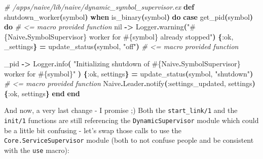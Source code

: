 \documentclass[
  oneside]{book}
\newenvironment{Shaded}{\begin{snugshade}}{\end{snugshade}}
\newcommand{\CommentTok}[1]{\textcolor[rgb]{0.56,0.35,0.01}{\textit{#1}}}
\newcommand{\ConstantTok}[1]{\textcolor[rgb]{0.56,0.35,0.01}{#1}}
\newcommand{\FunctionTok}[1]{\textcolor[rgb]{0.13,0.29,0.53}{\textbf{#1}}}
\newcommand{\KeywordTok}[1]{\textcolor[rgb]{0.13,0.29,0.53}{\textbf{#1}}}
\newcommand{\NormalTok}[1]{#1}
\newcommand{\OperatorTok}[1]{\textcolor[rgb]{0.81,0.36,0.00}{\textbf{#1}}}
\newcommand{\OtherTok}[1]{\textcolor[rgb]{0.56,0.35,0.01}{#1}}
\newcommand{\StringTok}[1]{\textcolor[rgb]{0.31,0.60,0.02}{#1}}
\newcommand{\VariableTok}[1]{\textcolor[rgb]{0.00,0.00,0.00}{#1}}
\begin{document}
\begin{Shaded}
\begin{Highlighting}[]
  \CommentTok{\# /apps/naive/lib/naive/dynamic\_symbol\_supervisor.ex}
  \KeywordTok{def}\NormalTok{ shutdown\_worker}\FunctionTok{(}\NormalTok{symbol}\FunctionTok{)} \KeywordTok{when}\NormalTok{ is\_binary}\FunctionTok{(}\NormalTok{symbol}\FunctionTok{)} \KeywordTok{do}
    \KeywordTok{case}\NormalTok{ get\_pid}\FunctionTok{(}\NormalTok{symbol}\FunctionTok{)} \KeywordTok{do} \CommentTok{\# \textless{}= macro provided function}
      \ConstantTok{nil} \OperatorTok{{-}\textgreater{}}
        \ConstantTok{Logger}\OperatorTok{.}\NormalTok{warning}\FunctionTok{(}\StringTok{"}\OtherTok{\#\{}\ConstantTok{Naive}\OperatorTok{.}\ConstantTok{SymbolSupervisor}\OtherTok{\}}\StringTok{ worker for }\OtherTok{\#\{}\NormalTok{symbol}\OtherTok{\}}\StringTok{ already stopped"}\FunctionTok{)}
        \FunctionTok{\{}\VariableTok{:ok}\NormalTok{, \_settings}\FunctionTok{\}} \OperatorTok{=}\NormalTok{ update\_status}\FunctionTok{(}\NormalTok{symbol, }\StringTok{"off"}\FunctionTok{)} \CommentTok{\# \textless{}= macro provided function}

\NormalTok{      \_pid }\OperatorTok{{-}\textgreater{}}
        \ConstantTok{Logger}\OperatorTok{.}\NormalTok{info}\FunctionTok{(}
          \StringTok{"Initializing shutdown of }\OtherTok{\#\{}\ConstantTok{Naive}\OperatorTok{.}\ConstantTok{SymbolSupervisor}\OtherTok{\}}\StringTok{ worker for }\OtherTok{\#\{}\NormalTok{symbol}\OtherTok{\}}\StringTok{"}
        \FunctionTok{)}
        \FunctionTok{\{}\VariableTok{:ok}\NormalTok{, settings}\FunctionTok{\}} \OperatorTok{=}\NormalTok{ update\_status}\FunctionTok{(}\NormalTok{symbol, }\StringTok{"shutdown"}\FunctionTok{)} \CommentTok{\# \textless{}= macro provided function}
        \ConstantTok{Naive}\OperatorTok{.}\ConstantTok{Leader}\OperatorTok{.}\NormalTok{notify}\FunctionTok{(}\VariableTok{:settings\_updated}\NormalTok{, settings}\FunctionTok{)}
        \FunctionTok{\{}\VariableTok{:ok}\NormalTok{, settings}\FunctionTok{\}}
    \KeywordTok{end}
  \KeywordTok{end}
\end{Highlighting}
\end{Shaded}

And now, a very last change - I promise ;) Both the \texttt{start\_link/1} and the \texttt{init/1} functions are still referencing the \texttt{DynamicSupervisor} module which could be a little bit confusing - let's swap those calls to use the \texttt{Core.ServiceSupervisor} module (both to not confuse people and be consistent with the \texttt{use} macro):
\end{document}
